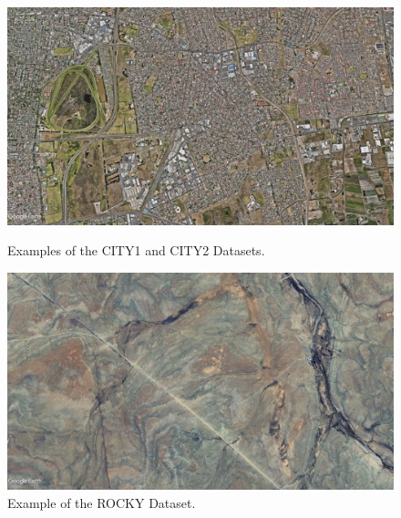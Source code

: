 \begin{figure}[H]
    \centering
    \begin{minipage}{0.4\textwidth}
        \centering
        \includegraphics[width=\textwidth]{./Chapter 4/DEMODATASETS/CITY1.jpg}
        \caption{Examples of the CITY1 and CITY2 Datasets.}
        \label{fig:CITY12}
    \end{minipage}\hfill
    \begin{minipage}{0.4\textwidth}
        \centering
        \includegraphics[width=\textwidth]{./Chapter 4/DEMODATASETS/ROCKY.jpg}
        \caption{Example of the ROCKY Dataset.}
        \label{fig:ROCKY}
    \end{minipage}
    
    \vspace{0.15cm} %
    

\end{figure}
